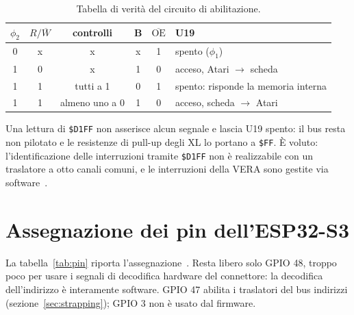 \documentclass[11pt,a4paper,twoside,openright]{report}
\newcommand{\hex}[1]{\texttt{\$#1}}
\begin{document}
\begin{table}[htbp]
  \centering
  \caption{Tabella di verità del circuito di abilitazione.}
  \label{tab:gating}
  \small
  \begin{tabular}{cccccl}
    \toprule
    $\phi_2$ & $R/\overline{W}$ & controlli & B & $\overline{\text{OE}}$ & U19 \\
    \midrule
    0 & x & x & x & 1 & spento ($\phi_1$) \\
    1 & 0 & x & 1 & 0 & acceso, Atari $\to$ scheda \\
    1 & 1 & tutti a 1 & 0 & 1 & spento: risponde la memoria interna \\
    1 & 1 & almeno uno a 0 & 1 & 0 & acceso, scheda $\to$ Atari \\
    \bottomrule
  \end{tabular}
\end{table}

Una lettura di \hex{D1FF} non asserisce alcun segnale e lascia U19 spento: il bus resta non
pilotato e le resistenze di pull-up degli XL lo portano a \hex{FF}. È voluto: l'identificazione
delle interruzioni tramite \hex{D1FF} non è realizzabile con un traslatore a otto canali
comuni, e le interruzioni della VERA sono gestite via software~\cite[§2.4]{hwreq}.

\section{Assegnazione dei pin dell'ESP32-S3}

La tabella~\ref{tab:pin} riporta l'assegnazione~\cite{pinmap}. Resta libero solo GPIO 48,
troppo poco per usare i segnali di decodifica hardware del connettore: la decodifica
dell'indirizzo è interamente software. GPIO 47 abilita i traslatori del bus indirizzi
(sezione~\ref{sec:strapping}); GPIO 3 non è usato dal firmware.
\end{document}
